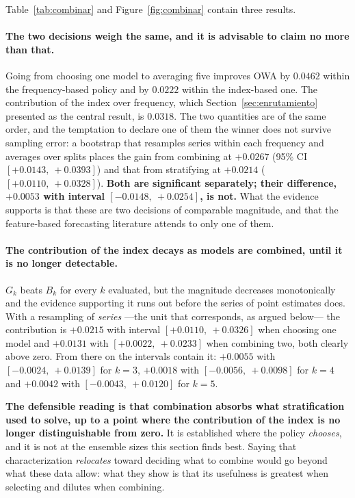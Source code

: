 Table~\ref{tab:combinar} and Figure~\ref{fig:combinar} contain three results.

\paragraph{The two decisions weigh the same, and it is advisable to claim no more than
that.} Going from choosing one model to averaging five improves OWA by $0.0462$ within the
frequency-based policy and by $0.0222$ within the index-based one. The contribution of the
index over frequency, which Section~\ref{sec:enrutamiento} presented as the central
result, is $0.0318$. The two quantities are of the same order, and the temptation to
declare one of them the winner does not survive sampling error: a bootstrap that resamples
series within each frequency and averages over splits places the gain from combining at
$+0.0267$ (95\% CI $[+0.0143,\ +0.0393]$) and that from stratifying at $+0.0214$
($[+0.0110,\ +0.0328]$). \textbf{Both are significant separately; their difference,
$+0.0053$ with interval $[-0.0148,\ +0.0254]$, is not.} What the evidence supports is that
these are two decisions of comparable magnitude, and that the feature-based forecasting
literature attends to only one of them.

\paragraph{The contribution of the index decays as models are combined, until it is no
longer detectable.} $G_k$ beats $B_k$ for every $k$ evaluated, but the magnitude decreases
monotonically and the evidence supporting it runs out before the series of point estimates
does. With a resampling of \emph{series} ---the unit that corresponds, as argued below---
the contribution is $+0.0215$ with interval $[+0.0110,\ +0.0326]$ when choosing one model
and $+0.0131$ with $[+0.0022,\ +0.0233]$ when combining two, both clearly above zero. From
there on the intervals contain it: $+0.0055$ with $[-0.0024,\ +0.0139]$ for $k=3$,
$+0.0018$ with $[-0.0056,\ +0.0098]$ for $k=4$ and $+0.0042$ with $[-0.0043,\ +0.0120]$
for $k=5$.

\textbf{The defensible reading is that combination absorbs what stratification used to
solve, up to a point where the contribution of the index is no longer distinguishable from
zero.} It is established where the policy \emph{chooses}, and it is not at the ensemble
sizes this section finds best. Saying that characterization \emph{relocates} toward
deciding what to combine would go beyond what these data allow: what they show is that its
usefulness is greatest when selecting and dilutes when combining.

